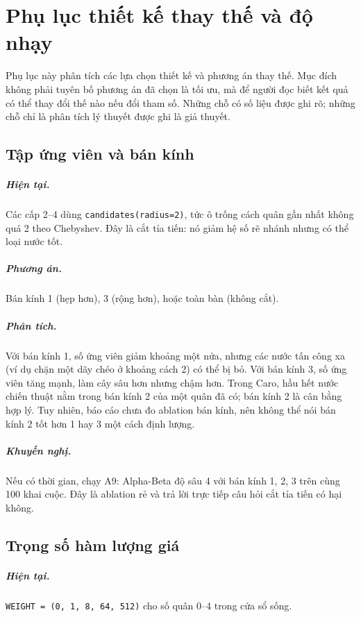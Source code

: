 \chapter{Phụ lục thiết kế thay thế và độ nhạy}
\label{app:thiet-ke}

Phụ lục này phân tích các lựa chọn thiết kế và phương án thay thế. Mục đích không phải tuyên bố
phương án đã chọn là tối ưu, mà để người đọc biết kết quả có thể thay đổi thế nào nếu đổi tham
số. Những chỗ có số liệu được ghi rõ; những chỗ chỉ là phân tích lý thuyết được ghi là giả
thuyết.

\section{Tập ứng viên và bán kính}
\paragraph{Hiện tại.} Các cấp 2--4 dùng \texttt{candidates(radius=2)}, tức ô trống cách quân gần
nhất không quá 2 theo Chebyshev. Đây là cắt tỉa tiến: nó giảm hệ số rẽ nhánh nhưng có thể loại
nước tốt.
\paragraph{Phương án.} Bán kính 1 (hẹp hơn), 3 (rộng hơn), hoặc toàn bàn (không cắt).
\paragraph{Phân tích.} Với bán kính 1, số ứng viên giảm khoảng một nửa, nhưng các nước tấn công
xa (ví dụ chặn một dãy chéo ở khoảng cách 2) có thể bị bỏ. Với bán kính 3, số ứng viên tăng
mạnh, làm cây sâu hơn nhưng chậm hơn. Trong Caro, hầu hết nước chiến thuật nằm trong bán kính
2 của một quân đã có; bán kính 2 là cân bằng hợp lý. Tuy nhiên, báo cáo chưa đo ablation bán
kính, nên không thể nói bán kính 2 tốt hơn 1 hay 3 một cách định lượng.
\paragraph{Khuyến nghị.} Nếu có thời gian, chạy A9: Alpha-Beta độ sâu 4 với bán kính 1, 2, 3
trên cùng 100 khai cuộc. Đây là ablation rẻ và trả lời trực tiếp câu hỏi cắt tỉa tiến có hại
không.

\section{Trọng số hàm lượng giá}
\paragraph{Hiện tại.} \texttt{WEIGHT = (0, 1, 8, 64, 512)} cho số quân 0--4 trong cửa sổ sống.

